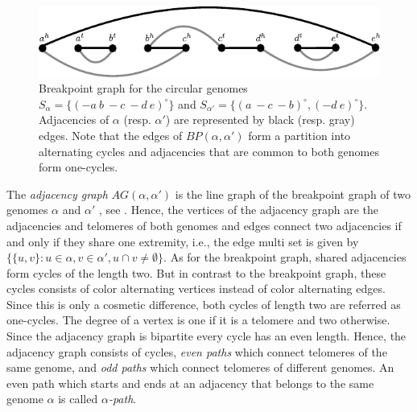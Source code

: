 \documentclass{svmult}
\begin{document}
\begin{figure}
\centering
\includegraphics[width=.7\textwidth]{figures/breakpoint_graph_circular.pdf}
\caption{Breakpoint graph for the circular genomes
$S_{\alpha}=\{(-{a}~b~-{c}~-{d}~e)^\circ\}$ and
$S_{\alpha'}=\{(a~-{c}~-{b})^\circ,(-{d}~e)^\circ\}$. Adjacencies of
$\alpha$ (resp. $\alpha'$) are represented by black (resp. gray) edges. Note that the
edges of $BP(\alpha,\alpha')$ form a partition into alternating cycles and 
adjacencies that are common to both genomes form one-cycles.}
\label{fig:breakpoint_graph_circular}
\end{figure}

The \emph{adjacency graph} $AG(\alpha,\alpha')$ is the line graph of the
breakpoint graph of two genomes $\alpha$ and $\alpha'$ \cite{Bergeron_2006},
see .
%
Hence, the vertices of the adjacency graph are the adjacencies and telomeres 
of both genomes and edges connect two adjacencies if and
only if they share one extremity, i.e., the edge multi set is given by $\{\{u,v\} : u\in\alpha, v\in\alpha', u\cap v\neq \emptyset \}$.
As for the breakpoint graph, shared adjacencies form cycles of
the length two. But in contrast to the breakpoint graph, these cycles consists
of color alternating vertices instead of color alternating edges. Since this is
only a cosmetic difference, both cycles of length two are referred as
one-cycles.
%
The degree of a vertex is one if it is a telomere and two otherwise. Since the
adjacency graph is bipartite every cycle has an even length.
%
Hence, the adjacency graph consists of cycles, \emph{even paths}
which connect telomeres of the same genome, and \emph{odd paths}
which connect telomeres of different genomes.
%
%
An even path which starts and ends at an adjacency that belongs to the same
genome $\alpha$ is called \emph{$\alpha$-path}.
%
%
\end{document}
